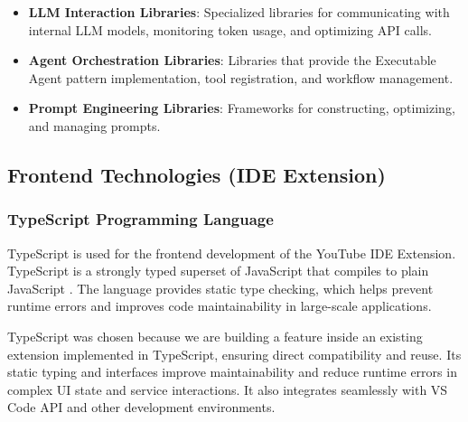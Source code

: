 \begin{spacing}{1.2}
\begin{itemize}
    \item \textbf{LLM Interaction Libraries}: Specialized libraries for communicating with internal LLM models, monitoring token usage, and optimizing API calls.
    \item \textbf{Agent Orchestration Libraries}: Libraries that provide the Executable Agent pattern implementation, tool registration, and workflow management.
    \item \textbf{Prompt Engineering Libraries}: Frameworks for constructing, optimizing, and managing prompts.
\end{itemize}

\subsection{Frontend Technologies (IDE Extension)}

\subsubsection{TypeScript Programming Language}
TypeScript is used for the frontend development of the YouTube IDE Extension. TypeScript is a strongly typed superset of JavaScript that compiles to plain JavaScript \cite{bierman2014understanding}. The language provides static type checking, which helps prevent runtime errors and improves code maintainability in large-scale applications.

TypeScript was chosen because we are building a feature inside an existing extension implemented in TypeScript, ensuring direct compatibility and reuse. Its static typing and interfaces improve maintainability and reduce runtime errors in complex UI state and service interactions. It also integrates seamlessly with VS Code API and other development environments.


\end{spacing}
